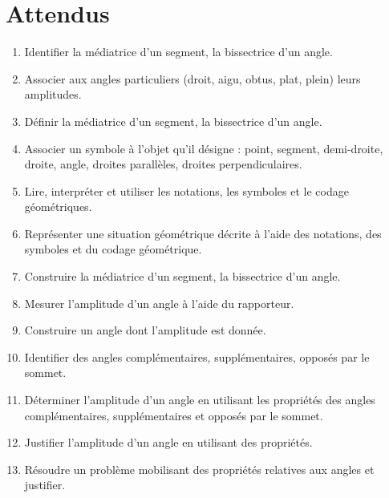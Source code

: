 \documentclass[../../syllabus_1.tex]{subfiles}
\begin{document}
\section*{Attendus}
\begin{enumerate}[label=\textbf{\arabic*.}]
    \item Identifier la médiatrice d'un segment, la bissectrice d'un angle.
    \item Associer aux angles particuliers (droit, aigu, obtus, plat, plein) leurs amplitudes.
    \item Définir la médiatrice d'un segment, la bissectrice d'un angle.
    \item Associer un symbole à l'objet qu'il désigne : point, segment, demi-droite, droite, angle, droites parallèles, droites perpendiculaires.
    \item Lire, interpréter et utiliser les notations, les symboles et le codage géométriques.
    \item Représenter une situation géométrique décrite à l'aide des notations, des symboles et du codage géométrique.
    \item Construire la médiatrice d'un segment, la bissectrice d'un angle.
    \item Mesurer l'amplitude d'un angle à l'aide du rapporteur.
    \item Construire un angle dont l'amplitude est donnée.
    \item Identifier des angles complémentaires, supplémentaires, opposés par le sommet.
    \item Déterminer l'amplitude d'un angle en utilisant les propriétés des angles complémentaires, supplémentaires et opposés par le sommet.
    \item Justifier l'amplitude d'un angle en utilisant des propriétés.
    \item Résoudre un problème mobilisant des propriétés relatives aux angles et justifier.
\end{enumerate}
\end{document}
